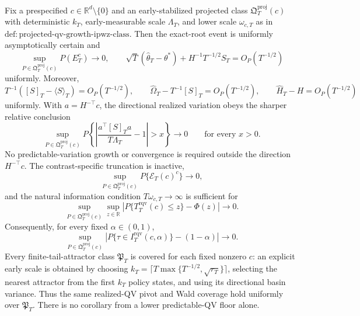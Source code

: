 Fix a prespecified \(c\in\mathbb R^d\setminus\{0\}\) and an early-stabilized projected class \(\mathfrak Q_T^{\mathrm{proj}}(c)\) with deterministic \(k_T\), early-measurable scale \(\Lambda_T\), and lower scale \(\omega_{c,T}\) as in \(\mathrm{def:projected\text{-}qv\text{-}growth\text{-}ipwz\text{-}class}\). Then the exact-root event is uniformly asymptotically certain and
\[
 \sup_{P\in\mathfrak Q_T^{\mathrm{proj}}(c)}P(E_T^c)\longrightarrow0,
 \qquad
 \sqrt T(\widehat\theta_T-\theta^*)+H^{-1}T^{-1/2}S_T
 =O_P(T^{-1/2})
\]
uniformly. Moreover,
\[
 T^{-1}([S]_T-\langle S\rangle_T)=O_P(T^{-1/2}),\qquad
 \widehat\Omega_T-T^{-1}[S]_T=O_P(T^{-1/2}),\qquad
 \widehat H_T-H=O_P(T^{-1/2})
\]
uniformly. With \(a=H^{-\top}c\), the directional realized variation obeys the sharper relative conclusion
\[
 \sup_{P\in\mathfrak Q_T^{\mathrm{proj}}(c)}
 P\!\left\{\left|\frac{a^\top[S]_Ta}{T\Lambda_T}-1\right|>x\right\}
 \longrightarrow0\qquad\text{for every }x>0.
\]
No predictable-variation growth or convergence is required outside the direction \(H^{-\top}c\). The contrast-specific truncation is inactive,
\[
 \sup_{P\in\mathfrak Q_T^{\mathrm{proj}}(c)}P\{\mathcal E_T(c)^c\}
 \longrightarrow0,
\]
and the natural information condition \(T\omega_{c,T}\to\infty\) is sufficient for
\[
 \sup_{P\in\mathfrak Q_T^{\mathrm{proj}}(c)}\sup_{z\in\mathbb R}
 \left|P\{T_T^{\mathrm{rqv}}(c)\le z\}-\Phi(z)\right|
 \longrightarrow0.
\]
Consequently, for every fixed \(\alpha\in(0,1)\),
\[
 \sup_{P\in\mathfrak Q_T^{\mathrm{proj}}(c)}
 \left|P\{\tau\in I_T^{\mathrm{rqv}}(c,\alpha)\}-(1-\alpha)\right|
 \longrightarrow0.
\]
Every finite-tail-attractor class \(\mathfrak P_T\) is covered for each fixed nonzero \(c\): an explicit early scale is obtained by choosing \(k_T=\lceil T\max\{T^{-1/2},\sqrt{r_T}\}\rceil\), selecting the nearest attractor from the first \(k_T\) policy states, and using its directional basin variance. Thus the same realized-QV pivot and Wald coverage hold uniformly over \(\mathfrak P_T\). There is no corollary from a lower predictable-QV floor alone.